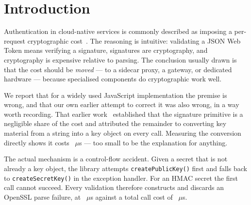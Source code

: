 \documentclass[pdflatex,sn-basic,twocolumn]{sn-jnl}
\begin{document}
\maketitle

\section{Introduction}\label{sec:intro}

Authentication in cloud-native services is commonly described as imposing a
per-request cryptographic cost~\cite{zhu2023dissecting,sikdar2026quantifying}. The reasoning is intuitive: validating a JSON
Web Token means verifying a signature, signatures are cryptography, and
cryptography is expensive relative to parsing. The conclusion usually drawn is
that the cost should be \emph{moved} --- to a sidecar proxy, a gateway, or
dedicated hardware --- because specialised components do cryptographic work well.

We report that for a widely used JavaScript implementation the premise
is wrong, and that our own earlier attempt to correct it was also wrong, in a way
worth recording. That earlier work~\cite{sikdar2026quantifying} established that the signature primitive is a
negligible share of the cost and attributed the remainder to converting key
material from a string into a key object on every call. Measuring the conversion
directly shows it costs \HostCreateSecretKey~$\mu$s --- too small to be the
explanation for anything.

The actual mechanism is a control-flow accident. Given a secret that is not
already a key object, the library attempts \texttt{createPublicKey()} first and
falls back to \texttt{createSecretKey()} in the exception handler. For an HMAC
secret the first call cannot succeed. Every validation therefore constructs and
discards an OpenSSL parse failure, at \HostProbeThrows~$\mu$s against a total call
cost of \HostJwtString~$\mu$s.
\end{document}
